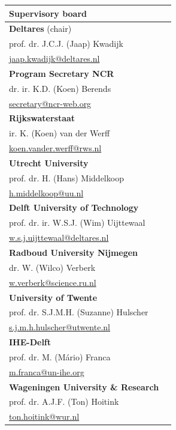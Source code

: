 \begin{table}
\begin{tabular}[t]{ll}
		\end{tabular}
    \begin{tabular}[t]{ll}
        \textbf{Supervisory board}\\
        \hline
        \textbf{Deltares} (chair) \\
           prof. dr. J.C.J. (Jaap) Kwadijk \\ 
           \url{jaap.kwadijk@deltares.nl} \\
        \textbf{Program Secretary NCR} \\
            dr. ir. K.D. (Koen) Berends\\
            \url{secretary@ncr-web.org} \\
       \textbf{Rijkswaterstaat} \\
           ir. K. (Koen) van der Werff\\
           \url{koen.vander.werff@rws.nl} \\
       \textbf{Utrecht University} \\
            prof. dr. H. (Hans) Middelkoop \\ 
           \url{h.middelkoop@uu.nl} \\
       \textbf{Delft University of Technology} \\
            prof. dr. ir. W.S.J. (Wim) Uijttewaal \\ 
            \url{w.s.j.uijttewaal@deltares.nl} \\
       \textbf{Radboud University Nijmegen} \\
            dr. W. (Wilco) Verberk \\
            \url{w.verberk@science.ru.nl}\\
       \textbf{University of Twente} \\
            prof. dr. S.J.M.H. (Suzanne) Hulscher \\
            \url{s.j.m.h.hulscher@utwente.nl}\\
       \textbf{IHE-Delft} \\
            prof. dr. M. (M\'ario) Franca \\
            \url{m.franca@un-ihe.org}\\
        \textbf{Wageningen University \& Research}\\
            prof. dr. A.J.F. (Ton) Hoitink \\
            \url{ton.hoitink@wur.nl}\\

    \end{tabular}
	\end{table}



